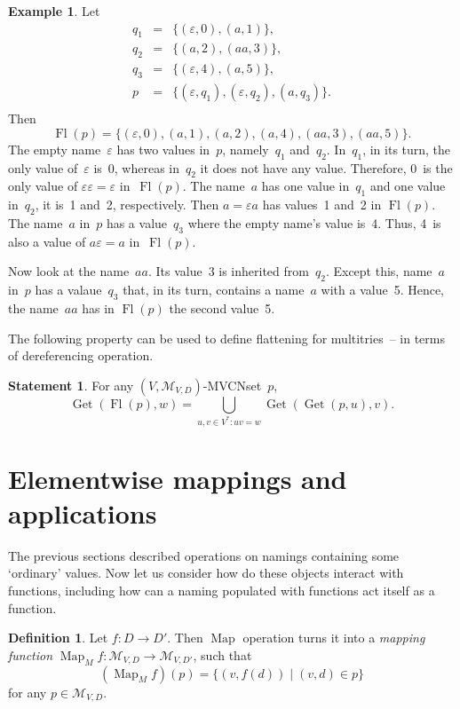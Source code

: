 \documentclass{article}
\theoremstyle{definition}
\newtheorem{Df}{Definition}
\newtheorem{St}{Statement}
\newtheorem{Ex}{Example}
\newcommand{\setcharmvcn}{M}
\newcommand{\setsymbol}[3]{\mathcal{#1}_{#2,#3}}
\newcommand{\setmvcn}[2]{\setsymbol{\setcharmvcn}{#1}{#2}}
\newcommand{\flatten}{\operatorname{Fl}}
\newcommand{\deref}{\operatorname{Get}}
\newcommand{\fmap}{\operatorname{Map}}
\begin{document}
\begin{Ex}\label{ex:flatten}
Let
\begin{eqnarray*}
  q_1 & = & \{ (\varepsilon, 0), (a, 1) \} ,\\
  q_2 & = & \{ (a, 2), (aa, 3) \} ,\\
  q_3 & = & \{ (\varepsilon, 4), (a, 5) \} ,\\
  p   & = & \{ (\varepsilon, q_1), (\varepsilon, q_2), (a, q_3) \} .\\
\end{eqnarray*}
Then
\[
  \flatten(p) = \{
      (\varepsilon, 0), (a, 1), (a, 2), (a, 4), (aa, 3), (aa, 5)
  \} .
\]
The empty name~$\varepsilon$ has two values in~$p$, namely~$q_1$ and~$q_2$.
In~$q_1$, in its turn, the only value of~$\varepsilon$ is~0, whereas in~$q_2$
it does not have any value. Therefore, 0~is the only value of $\varepsilon
\varepsilon = \varepsilon$ in~$\flatten(p)$.  The name~$a$ has one value in~$q_1$
and one value in~$q_2$, it is~1 and~2, respectively.  Then $a = \varepsilon a$
has values~1 and~2 in $\flatten(p)$.  The name~$a$ in~$p$ has a value~$q_3$
where the empty name's value is~4. Thus, 4~is also a value of $a \varepsilon =
a$ in~$\flatten(p)$.

Now look at the name~$aa$. Its value~3 is inherited from~$q_2$. Except this,
name~$a$ in~$p$ has a valaue~$q_3$ that, in its turn, contains a name~$a$ with
a value~5. Hence, the name~$aa$ has in $\flatten(p)$ the second value~5.
\end{Ex}

The following property can be used to define flattening for multitries~--
in terms of dereferencing operation.
\begin{St}\label{st:deref-flatten}
For any $(V,\setmvcn{V}{D})$-MVCNset~$p$,
\[
  \deref(\flatten(p), w) =
      \bigcup_{u,v\in V^\ast: uv = w}
        \deref(\deref(p, u), v) .
\]
\end{St}



\section{Elementwise mappings and applications}

The previous sections described operations on namings containing some
`ordinary' values. Now let us consider how do these objects interact with
functions, including how can a naming populated with functions act itself
as a function.

\begin{Df}\label{df:mvcn-map}
Let $f : D \to D'$. Then $\fmap$ operation turns it into a \emph{mapping
function} $\fmap_{\setcharmvcn} f : \setmvcn{V}{D} \to \setmvcn{V}{D'}$, such
that
\[
  (\fmap_{\setcharmvcn} f)(p) = \{ (v, f(d)) \mid (v, d) \in p \}
\]
for any $p \in \setmvcn{V}{D}$.
\end{Df}
\end{document}
